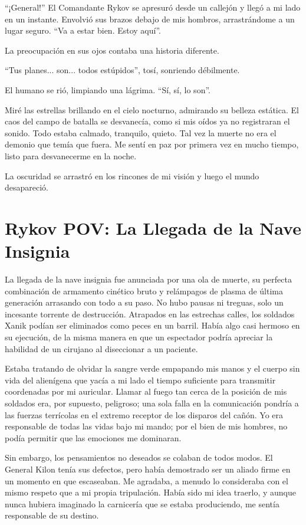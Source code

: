 \documentclass[spanish,12pt,a4paper,oneside,titlepage]{book}
\begin{document}
    ``¡General!'' El Comandante Rykov se apresuró desde un callejón y llegó a mi lado en un instante. Envolvió sus brazos debajo de mis hombros, arrastrándome a un lugar seguro. ``Va a estar bien. Estoy aquí''.

    La preocupación en sus ojos contaba una historia diferente.

    ``Tus planes... son... todos estúpidos'', tosí, sonriendo débilmente.

    El humano se rió, limpiando una lágrima. ``Sí, sí, lo son''.

    Miré las estrellas brillando en el cielo nocturno, admirando su belleza estática. El caos del campo de batalla se desvanecía, como si mis oídos ya no registraran el sonido. Todo estaba calmado, tranquilo, quieto. Tal vez la muerte no era el demonio que temía que fuera. Me sentí en paz por primera vez en mucho tiempo, listo para desvanecerme en la noche.

    La oscuridad se arrastró en los rincones de mi visión y luego el mundo desapareció.

    \chapter{Rykov POV: La Llegada de la Nave Insignia}

    La llegada de la nave insignia fue anunciada por una ola de muerte, su perfecta combinación de armamento cinético bruto y relámpagos de plasma de última generación arrasando con todo a su paso. No hubo pausas ni treguas, solo un incesante torrente de destrucción. Atrapados en las estrechas calles, los soldados Xanik podían ser eliminados como peces en un barril. Había algo casi hermoso en su ejecución, de la misma manera en que un espectador podría apreciar la habilidad de un cirujano al diseccionar a un paciente.

    Estaba tratando de olvidar la sangre verde empapando mis manos y el cuerpo sin vida del alienígena que yacía a mi lado el tiempo suficiente para transmitir coordenadas por mi auricular. Llamar al fuego tan cerca de la posición de mis soldados era, por supuesto, peligroso; una sola falla en la comunicación pondría a las fuerzas terrícolas en el extremo receptor de los disparos del cañón. Yo era responsable de todas las vidas bajo mi mando; por el bien de mis hombres, no podía permitir que las emociones me dominaran.

    Sin embargo, los pensamientos no deseados se colaban de todos modos. El General Kilon tenía sus defectos, pero había demostrado ser un aliado firme en un momento en que escaseaban. Me agradaba, a menudo lo consideraba con el mismo respeto que a mi propia tripulación. Había sido mi idea traerlo, y aunque nunca hubiera imaginado la carnicería que se estaba produciendo, me sentía responsable de su destino.
\end{document}
